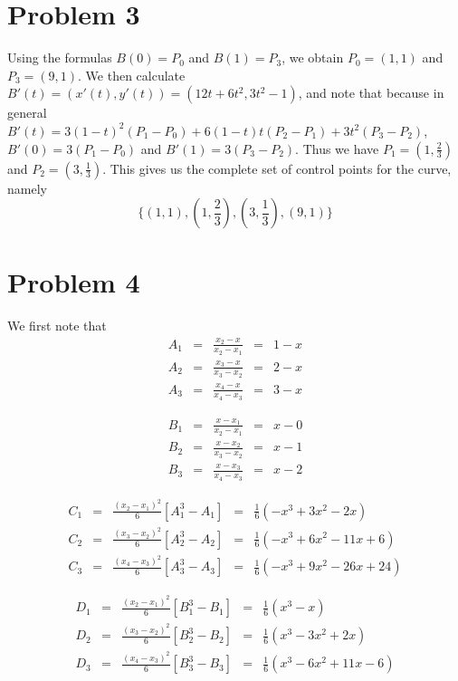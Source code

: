 \documentclass[11pt]{article} %
\begin{document}
\section*{Problem 3}
Using the formulas $B(0) = P_0$ and $B(1) = P_3$, we obtain $P_0 = (1,1)$ and $P_3 = (9,1)$. We then calculate $B'(t) = (x'(t),y'(t)) = (12t+6t^2,3t^2 - 1)$, and note that because in general $B'(t) = 3(1-t)^2(P_1 - P_0) + 6(1-t)t(P_2-P_1) + 3t^2(P_3 - P_2)$, $B'(0) = 3(P_1 - P_0)$ and $B'(1) = 3(P_3 - P_2)$. Thus we have $P_1 = (1,\frac{2}{3})$ and $P_2 = (3,\frac{1}{3})$. This gives us the complete set of control points for the curve, namely
$$\{(1,1),  (1,\frac{2}{3}),   (3,\frac{1}{3}), (9,1) \}$$
\section*{Problem 4}

We first note that 
$$\begin{array}{lclcl} A_1 & = &  \frac{x_2 - x}{x_2 - x_1} & = & 1-x \\
		        A_2 & = & \frac{x_3 - x}{x_3 - x_2} & = & 2-x \\
		        A_3 & = & \frac{x_4 - x}{x_4 - x_3} & = & 3-x 
\end{array}$$

$$\begin{array}{lclcl} B_1 & = &  \frac{x - x_1}{x_2 - x_1} & = & x - 0 \\
		        B_2 & = & \frac{x -x_2}{x_3 - x_2} & = & x - 1 \\
		        B_3 & = & \frac{x - x_3}{x_4 - x_3} & = & x - 2 
\end{array}$$

$$\begin{array}{lclcl} C_1 & = &  \frac{(x_2 - x_1)^2}{6}[A_1^3 - A_1] & = & \frac{1}{6}(-x^3 + 3x^2 - 2x) \\
		        C_2 & =&  \frac{(x_3 - x_2)^2}{6}[A_2^3 - A_2] & = &\frac{1}{6}(-x^3 + 6x^2 - 11x + 6) \\
		        C_3 & =&  \frac{(x_4 - x_3)^2}{6}[A_3^3 - A_3] & = & \frac{1}{6}(-x^3 + 9x^2 - 26x + 24) 
\end{array}$$

$$\begin{array}{lclcl} D_1 & = &  \frac{(x_2 - x_1)^2}{6}[B_1^3 - B_1] & = & \frac{1}{6}(x^3 - x) \\
		        D_2 & =&  \frac{(x_3 - x_2)^2}{6}[B_2^3 - B_2] & = &\frac{1}{6}(x^3 - 3x^2 + 2x) \\
		        D_3 & =&  \frac{(x_4 - x_3)^2}{6}[B_3^3 - B_3] & = & \frac{1}{6}(x^3 - 6x^2 + 11x - 6) 
\end{array}$$
\end{document}

